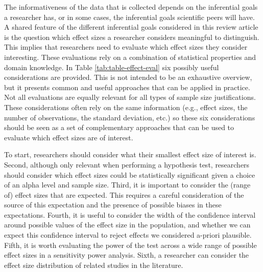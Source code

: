 \documentclass[
  english,
  ,jou, a4paper,floatsintext]{apa6}
\begin{document}
The informativeness of the data that is collected depends on the inferential goals a researcher has, or in some cases, the inferential goals scientific peers will have. A shared feature of the different inferential goals considered in this review article is the question which effect sizes a researcher considers meaningful to distinguish. This implies that researchers need to evaluate which effect sizes they consider interesting. These evaluations rely on a combination of statistical properties and domain knowledge. In Table \ref{tab:table-effect-eval} six possibly useful considerations are provided. This is not intended to be an exhaustive overview, but it presents common and useful approaches that can be applied in practice. Not all evaluations are equally relevant for all types of sample size justifications. These considerations often rely on the same information (e.g., effect sizes, the number of observations, the standard deviation, etc.) so these six considerations should be seen as a set of complementary approaches that can be used to evaluate which effect sizes are of interest.

To start, researchers should consider what their smallest effect size of interest is. Second, although only relevant when performing a hypothesis test, researchers should consider which effect sizes could be statistically significant given a choice of an alpha level and sample size. Third, it is important to consider the (range of) effect sizes that are expected. This requires a careful consideration of the source of this expectation and the presence of possible biases in these expectations. Fourth, it is useful to consider the width of the confidence interval around possible values of the effect size in the population, and whether we can expect this confidence interval to reject effects we considered a-priori plausible. Fifth, it is worth evaluating the power of the test across a wide range of possible effect sizes in a sensitivity power analysis. Sixth, a researcher can consider the effect size distribution of related studies in the literature.
\end{document}
